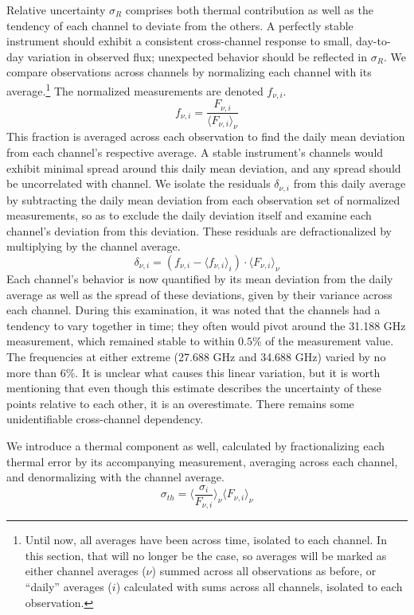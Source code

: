 \documentclass{article}
\begin{document}
	Relative uncertainty $\sigma_{R}$ comprises both thermal contribution as well as the tendency of each channel to deviate from the others.
	A perfectly stable instrument should exhibit a consistent cross-channel response to small, day-to-day variation in observed flux; unexpected behavior should be reflected in $\sigma_{R}$.
	We compare observations across channels by normalizing each channel with its average.\footnote{Until now, all averages have been across time, isolated to each channel.
	In this section, that will no longer be the case, so averages will be marked as either channel averages ($\nu$) summed across all observations as before, or ``daily'' averages ($i$) calculated with sums across all channels, isolated to each observation.}
	The normalized measurements are denoted $f_{\nu, i}$.
	$$ f_{\nu, i} = \frac{F_{\nu, i}}{\langle F_{\nu, i} \rangle_{\nu}} $$
	This fraction is averaged across each observation to find the daily mean deviation from each channel's respective average.
	A stable instrument's channels would exhibit minimal spread around this daily mean deviation, and any spread should be uncorrelated with channel.
	We isolate the residuals $\delta_{\nu, i}$ from this daily average by subtracting the daily mean deviation from each observation set of normalized measurements, so as to exclude the daily deviation itself and examine each channel's deviation from this deviation.
	These residuals are defractionalized by multiplying by the channel average.
	$$ \delta_{\nu, i} = (f_{\nu, i} - \langle f_{\nu, i} \rangle_{i}) \cdot \langle F_{\nu, i} \rangle_{\nu} $$
	Each channel's behavior is now quantified by its mean deviation from the daily average as well as the spread of these deviations, given by their variance across each channel.
	During this examination, it was noted that the channels had a tendency to vary together in time; they often would pivot around the 31.188 GHz measurement, which remained stable to within $0.5$\% of the measurement value.
	The frequencies at either extreme (27.688 GHz and 34.688 GHz) varied by no more than 6\%.
	It is unclear what causes this linear variation, but it is worth mentioning that even though this estimate describes the uncertainty of these points relative to each other, it is an overestimate.
	There remains some unidentifiable cross-channel dependency.

	We introduce a thermal component as well, calculated by fractionalizing each thermal error by its accompanying measurement, averaging across each channel, and denormalizing with the channel average.
	$$\sigma_{th} = \Bigg\langle \frac{\sigma_{i}}{F_{\nu,i}} \Bigg\rangle_{\nu} \langle F_{\nu, i} \rangle_{\nu} $$
\end{document}
